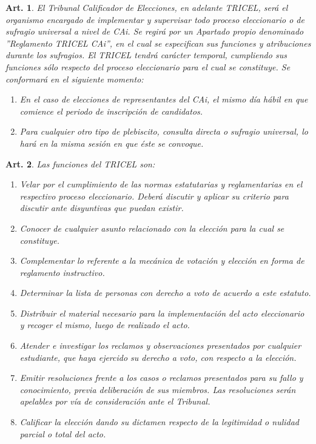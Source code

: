 \documentclass[letterpaper,11pt]{article}
\theoremstyle{plain}
\newtheorem{art}{Art.} %
\begin{document}
			\begin{art}\label{definicionTRICEL}
				El Tribunal Calificador de Elecciones, en adelante TRICEL, será el organismo encargado de implementar y supervisar todo proceso eleccionario o de sufragio universal a nivel de CAi. Se regirá por un Apartado propio denominado ''Reglamento TRICEL CAi'', en el cual se especifican sus funciones y atribuciones durante los sufragios. El TRICEL tendrá carácter temporal, cumpliendo sus funciones sólo respecto del proceso eleccionario para el cual se constituye. Se conformará en el siguiente momento:
				\begin{enumerate}
					\item En el caso de elecciones de representantes del CAi, el mismo día hábil en que comience el periodo de inscripción de candidatos.
					\item Para cualquier otro tipo de plebiscito, consulta directa o sufragio universal, lo hará en la misma sesión en que éste se convoque.
				\end{enumerate}
			\end{art}

			\begin{art}\label{funcionesTRICEL}
				Las funciones del TRICEL son:
				\begin{enumerate}
					\item Velar por el cumplimiento de las normas estatutarias y reglamentarias en el respectivo proceso eleccionario. Deberá discutir y aplicar su criterio para discutir ante disyuntivas que puedan existir.
					\item Conocer de cualquier asunto relacionado con la elección para la cual se constituye.
					\item Complementar lo referente a la mecánica de votación y elección en forma de reglamento instructivo.
					\item Determinar la lista de personas con derecho a voto de acuerdo a este estatuto.
					\item Distribuir el material necesario para la implementación del acto eleccionario y recoger el mismo, luego de realizado el acto.
					\item Atender e investigar los reclamos y observaciones presentados por cualquier estudiante, que haya ejercido su derecho a voto, con respecto a la elección.
					\item Emitir resoluciones frente a los casos o reclamos presentados para su fallo y conocimiento, previa deliberación de sus miembros. Las resoluciones serán apelables por vía de consideración ante el Tribunal.
					\item Calificar la elección dando su dictamen respecto de la legitimidad o nulidad parcial o total del acto.
				\end{enumerate}
			\end{art}
\end{document}
